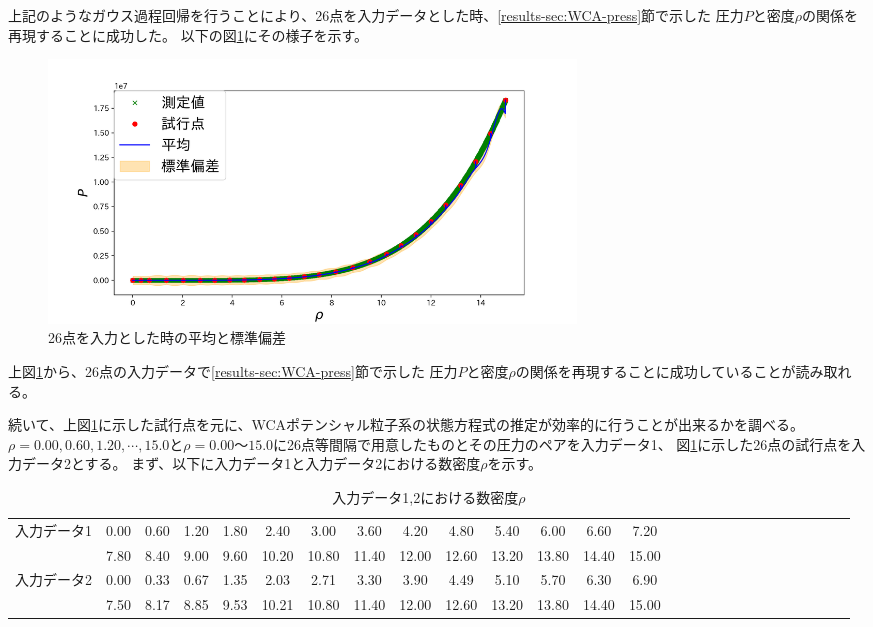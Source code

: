 \documentclass[titlepage]{jsreport}
\begin{document}
{{{上記のようなガウス過程回帰を行うことにより、26点を入力データとした時、\ref{results-sec:WCA-press}節で示した
圧力$P$と密度$\rho$の関係を再現することに成功した。
以下の図\ref{fig:26plot}にその様子を示す。

\begin{figure}[htbp]
    \begin{center}
        \includegraphics[width=14cm]{fig/26plot-Gauss.png}
    \end{center}
    \caption{26点を入力とした時の平均と標準偏差}
    \label{fig:26plot}
\end{figure}

上図\ref{fig:26plot}から、26点の入力データで\ref{results-sec:WCA-press}節で示した
圧力$P$と密度$\rho$の関係を再現することに成功していることが読み取れる。

続いて、上図\ref{fig:26plot}に示した試行点を元に、WCAポテンシャル粒子系の状態方程式の推定が効率的に行うことが出来るかを調べる。
$\rho=0.00,0.60,1.20,\cdots,15.0$と$\rho=0.00〜15.0$に26点等間隔で用意したものとその圧力のペアを入力データ1、
図\ref{fig:26plot}に示した26点の試行点を入力データ2とする。
まず、以下に入力データ1と入力データ2における数密度$\rho$を示す。

\begin{table}[htbp]
    \begin{center}
        \caption{入力データ1,2における数密度$\rho$}
            \begin{tabular}{c||c c c c c c c c c c c c c c c c c c c c c c c c c c}
               
                    入力データ1& 0.00&0.60&1.20&1.80&2.40&3.00&3.60&4.20&4.80&5.40&6.00&6.60&7.20\\
                    &7.80&8.40&9.00&9.60&10.20&10.80&11.40&12.00&12.60&13.20&13.80&14.40&15.00\\ \hline
                    入力データ2& 0.00&0.33&0.67&1.35&2.03&2.71&3.30&3.90&4.49&5.10&5.70&6.30&6.90\\
                    &7.50&8.17&8.85&9.53&10.21&10.80&11.40&12.00&12.60&13.20&13.80&14.40&15.00
                    

\end{tabular}
\end{center}
\end{table}}}}
\end{document}
